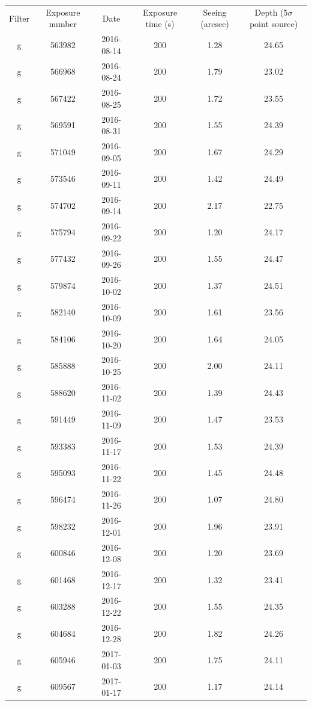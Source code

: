 \documentclass[letterpaper,preprint]{aastex62}
\begin{document}
\begin{table}
  \begin{center}
    \begin{tabular}{cccccc}
      Filter & Exposure number & Date & Exposure time (s) &
      Seeing (arcsec) & Depth ($5 \sigma$ point source) \\
      g & 563982 & 2016-08-14 & 200 & 1.28 & 24.65 \\
      g & 566968 & 2016-08-24 & 200 & 1.79 & 23.02 \\
      g & 567422 & 2016-08-25 & 200 & 1.72 & 23.55 \\
      g & 569591 & 2016-08-31 & 200 & 1.55 & 24.39 \\
      g & 571049 & 2016-09-05 & 200 & 1.67 & 24.29 \\
      g & 573546 & 2016-09-11 & 200 & 1.42 & 24.49 \\
      g & 574702 & 2016-09-14 & 200 & 2.17 & 22.75 \\
      g & 575794 & 2016-09-22 & 200 & 1.20 & 24.17 \\
      g & 577432 & 2016-09-26 & 200 & 1.55 & 24.47 \\
      g & 579874 & 2016-10-02 & 200 & 1.37 & 24.51 \\
      g & 582140 & 2016-10-09 & 200 & 1.61 & 23.56 \\
      g & 584106 & 2016-10-20 & 200 & 1.64 & 24.05 \\
      g & 585888 & 2016-10-25 & 200 & 2.00 & 24.11 \\
      g & 588620 & 2016-11-02 & 200 & 1.39 & 24.43 \\
      g & 591449 & 2016-11-09 & 200 & 1.47 & 23.53 \\
      g & 593383 & 2016-11-17 & 200 & 1.53 & 24.39 \\
      g & 595093 & 2016-11-22 & 200 & 1.45 & 24.48 \\
      g & 596474 & 2016-11-26 & 200 & 1.07 & 24.80 \\
      g & 598232 & 2016-12-01 & 200 & 1.96 & 23.91 \\
      g & 600846 & 2016-12-08 & 200 & 1.20 & 23.69 \\
      g & 601468 & 2016-12-17 & 200 & 1.32 & 23.41 \\
      g & 603288 & 2016-12-22 & 200 & 1.55 & 24.35 \\
      g & 604684 & 2016-12-28 & 200 & 1.82 & 24.26 \\
      g & 605946 & 2017-01-03 & 200 & 1.75 & 24.11 \\
      g & 609567 & 2017-01-17 & 200 & 1.17 & 24.14 \\

\end{tabular}
\end{center}
\end{table}
\end{document}
